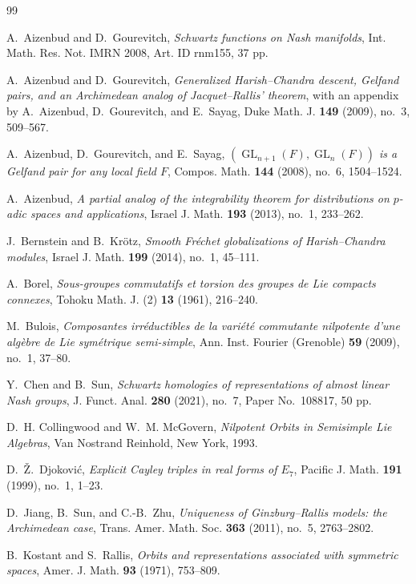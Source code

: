 \documentclass[11pt,reqno]{amsart}
\numberwithin{equation}{section}
\theoremstyle{definition}
\theoremstyle{remark}
\newcommand{\GL}{\operatorname{GL}}
\begin{document}
\begin{thebibliography}{99}

A.~Aizenbud and D.~Gourevitch,
\emph{Schwartz functions on Nash manifolds},
Int. Math. Res. Not. IMRN 2008, Art. ID rnm155, 37 pp.

A.~Aizenbud and D.~Gourevitch,
\emph{Generalized Harish--Chandra descent, Gelfand pairs, and an Archimedean
analog of Jacquet--Rallis' theorem},
with an appendix by A.~Aizenbud, D.~Gourevitch, and E.~Sayag,
Duke Math. J. \textbf{149} (2009), no.~3, 509--567.

A.~Aizenbud, D.~Gourevitch, and E.~Sayag,
\emph{$(\GL_{n+1}(F),\GL_n(F))$ is a Gelfand pair for any local field $F$},
Compos. Math. \textbf{144} (2008), no.~6, 1504--1524.

A.~Aizenbud,
\emph{A partial analog of the integrability theorem for distributions on
$p$-adic spaces and applications},
Israel J. Math. \textbf{193} (2013), no.~1, 233--262.

J.~Bernstein and B.~Kr\"otz,
\emph{Smooth Fr\'echet globalizations of Harish--Chandra modules},
Israel J. Math. \textbf{199} (2014), no.~1, 45--111.

A.~Borel,
\emph{Sous-groupes commutatifs et torsion des groupes de Lie compacts connexes},
Tohoku Math. J. (2) \textbf{13} (1961), 216--240.

M.~Bulois,
\emph{Composantes irr\'eductibles de la vari\'et\'e commutante nilpotente d'une
alg\`ebre de Lie sym\'etrique semi-simple},
Ann. Inst. Fourier (Grenoble) \textbf{59} (2009), no.~1, 37--80.

Y.~Chen and B.~Sun,
\emph{Schwartz homologies of representations of almost linear Nash groups},
J. Funct. Anal. \textbf{280} (2021), no.~7, Paper No.~108817, 50 pp.

D.~H. Collingwood and W.~M. McGovern,
\emph{Nilpotent Orbits in Semisimple Lie Algebras},
Van Nostrand Reinhold, New York, 1993.

D.~\v{Z}.~Djokovi\'c,
\emph{Explicit Cayley triples in real forms of $E_7$},
Pacific J. Math. \textbf{191} (1999), no.~1, 1--23.

D.~Jiang, B.~Sun, and C.-B.~Zhu,
\emph{Uniqueness of Ginzburg--Rallis models: the Archimedean case},
Trans. Amer. Math. Soc. \textbf{363} (2011), no.~5, 2763--2802.

B.~Kostant and S.~Rallis,
\emph{Orbits and representations associated with symmetric spaces},
Amer. J. Math. \textbf{93} (1971), 753--809.


\end{thebibliography}
\end{document}
